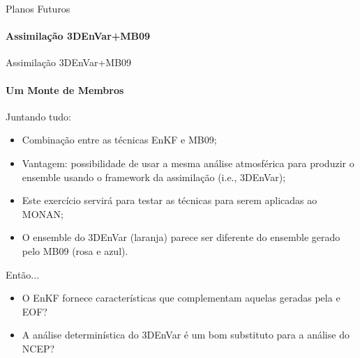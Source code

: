 \documentclass[10pt,aspectratio=169]{beamer}
\begin{document}
\begin{frame}{Planos Futuros}
\framesubtitle{Assimilação 3DEnVar+MB09}
\vspace{-0.75em}
\begin{figure}[t]
  \centering
  
\end{figure}
\end{frame}

\begin{frame}{Assimilação 3DEnVar+MB09}
\framesubtitle{Um Monte de Membros}
\begin{block}{Juntando tudo:}
	\begin{itemize}
		\item Combinação entre as técnicas EnKF e MB09;
		\pause
		\item Vantagem: possibilidade de usar a mesma análise atmosférica para produzir o ensemble usando o framework da assimilação (i.e., 3DEnVar);
		\pause
		\item Este exercício servirá para testar as técnicas para serem aplicadas ao MONAN;
		\pause
		\item O ensemble do 3DEnVar (laranja) parece ser diferente do ensemble gerado pelo MB09 (rosa e azul).
	\end{itemize}
\end{block}
\pause
\begin{block}{Então...}
	\begin{itemize}
		\item O EnKF fornece características que complementam aquelas geradas pela e EOF? 
		\item A análise determinística do 3DEnVar é um bom substituto para a análise do NCEP?
	\end{itemize}
\end{block}
\end{frame}
\end{document}
